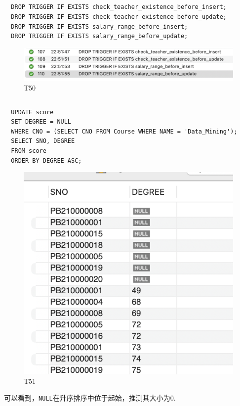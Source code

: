 \documentclass[UTF8]{ctexart}
\begin{document}
\subsection{}
\begin{lstlisting}
  DROP TRIGGER IF EXISTS check_teacher_existence_before_insert;
  DROP TRIGGER IF EXISTS check_teacher_existence_before_update;
  DROP TRIGGER IF EXISTS salary_range_before_insert;
  DROP TRIGGER IF EXISTS salary_range_before_update;
\end{lstlisting}
\begin{figure}[H]
  \centering
  \includegraphics[scale=0.7]{pics/50.png}
  \caption*{T50}
\end{figure}

\subsection{}
\begin{lstlisting}
  UPDATE score
  SET DEGREE = NULL
  WHERE CNO = (SELECT CNO FROM Course WHERE NAME = 'Data_Mining');
  SELECT SNO, DEGREE
  FROM score
  ORDER BY DEGREE ASC;
\end{lstlisting}
\begin{figure}[H]
  \centering
  \includegraphics[scale=0.7]{pics/51.png}
  \caption*{T51}
\end{figure}
可以看到，\lstinline|NULL|在升序排序中位于起始，推测其大小为0.
\end{document}
